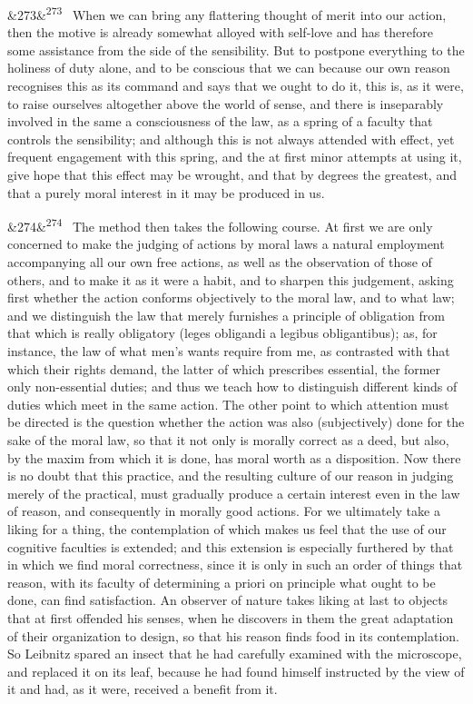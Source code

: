 \documentclass[12pt]{article}
\newcommand{\para}[1][]{\par\noindent\ifx&#1&\else\textsuperscript{\footnotesize #1}~\fi}
\begin{document}
\para[273] When we can bring any flattering thought of merit into our action, then the motive is already somewhat alloyed with self-love and has therefore some assistance from the side of the sensibility. But to postpone everything to the holiness of duty alone, and to be conscious that we can because our own reason recognises this as its command and says that we ought to do it, this is, as it were, to raise ourselves altogether above the world of sense, and there is inseparably involved in the same a consciousness of the law, as a spring of a faculty that controls the sensibility; and although this is not always attended with effect, yet frequent engagement with this spring, and the at first minor attempts at using it, give hope that this effect may be wrought, and that by degrees the greatest, and that a purely moral interest in it may be produced in us.

\para[274] The method then takes the following course. At first we are only concerned to make the judging of actions by moral laws a natural employment accompanying all our own free actions, as well as the observation of those of others, and to make it as it were a habit, and to sharpen this judgement, asking first whether the action conforms objectively to the moral law, and to what law; and we distinguish the law that merely furnishes a principle of obligation from that which is really obligatory (leges obligandi a legibus obligantibus); as, for instance, the law of what men's wants require from me, as contrasted with that which their rights demand, the latter of which prescribes essential, the former only non-essential duties; and thus we teach how to distinguish different kinds of duties which meet in the same action. The other point to which attention must be directed is the question whether the action was also (subjectively) done for the sake of the moral law, so that it not only is morally correct as a deed, but also, by the maxim from which it is done, has moral worth as a disposition. Now there is no doubt that this practice, and the resulting culture of our reason in judging merely of the practical, must gradually produce a certain interest even in the law of reason, and consequently in morally good actions. For we ultimately take a liking for a thing, the contemplation of which makes us feel that the use of our cognitive faculties is extended; and this extension is especially furthered by that in which we find moral correctness, since it is only in such an order of things that reason, with its faculty of determining a priori on principle what ought to be done, can find satisfaction. An observer of nature takes liking at last to objects that at first offended his senses, when he discovers in them the great adaptation of their organization to design, so that his reason finds food in its contemplation. So Leibnitz spared an insect that he had carefully examined with the microscope, and replaced it on its leaf, because he had found himself instructed by the view of it and had, as it were, received a benefit from it.
\end{document}
